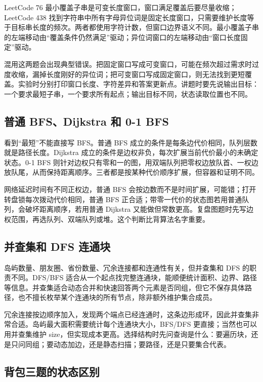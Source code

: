 LeetCode 76 最小覆盖子串是可变长度窗口，窗口满足覆盖后要尽量收缩；LeetCode 438 找到字符串中所有字母异位词是固定长度窗口，只需要维护长度等于目标串长度的频次。两者都使用字符计数，但窗口边界语义不同。最小覆盖子串的左端移动由“覆盖条件仍然满足”驱动；异位词窗口的左端移动由“窗口长度固定”驱动。

混用这两题会出现典型错误。把固定窗口写成可变窗口，可能在频次超过需求时过度收缩，漏掉长度刚好的异位词；把可变窗口写成固定窗口，则无法找到更短覆盖。实验时分别打印窗口长度、字符差异和答案更新点。讲题时要先说输出目标：一个要求最短子串，一个要求所有起点；输出目标不同，状态读取位置也不同。

\subsection{普通 BFS、Dijkstra 和 0-1 BFS}

看到“最短”不能直接写 BFS。普通 BFS 成立的条件是每条边代价相同，队列层数就是路径长度。Dijkstra 成立的条件是边权非负，每次扩展当前代价最小的未确定状态。0-1 BFS 则针对边权只有零和一的图，用双端队列把零权边放队首、一权边放队尾，从而保持距离顺序。三者都是按某种代价顺序扩展，但容器和证明不同。

网络延迟时间有不同正权边，普通 BFS 会按边数而不是时间扩展，可能错；打开转盘锁每次拨动代价相同，普通 BFS 正合适；带零一代价的状态图若用普通队列，会破坏距离顺序，若用普通 Dijkstra 又能做但常数更高。复盘图题时先写边权范围，再选队列、双端队列或堆。这个判断比背算法名字重要。

\subsection{并查集和 DFS 连通块}

岛屿数量、朋友圈、省份数量、冗余连接都和连通性有关，但并查集和 DFS 的职责不同。DFS/BFS 适合从一个起点找完整连通块，能顺便统计面积、边界、路径等信息。并查集适合动态合并和快速回答两个元素是否同组，但它不保存具体路径，也不擅长枚举某个连通块的所有节点，除非额外维护集合成员。

冗余连接按边顺序加入，发现两个端点已经连通时，这条边形成环，因此并查集非常合适。岛屿最大面积需要统计每个连通块大小，BFS/DFS 更直接；当然也可以用并查集维护 size，但实现成本更高。选择结构时先问查询是什么：要遍历块，还是只问同组；要动态加边，还是静态扫描；要路径，还是只要集合代表。

\subsection{背包三题的状态区别}


